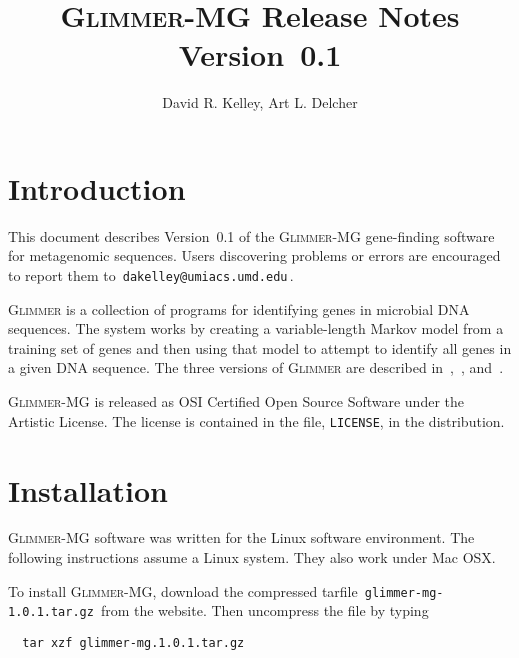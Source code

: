 \documentclass[fleqn,titlepage,11pt]{article}
\def\Glimmer{\textsc{Glimmer}}
\def\Gmg{\textsc{Glimmer-MG}}
\def\Pg#1{\texttt{#1}}
\begin{document}
\RaggedRight
\sloppy

\title{\Gmg{} Release Notes \\ Version~0.1}
\author{David R. Kelley, Art L. Delcher}

\maketitle

\section{Introduction}

This document describes Version~0.1 of the \Gmg{} gene-finding
software for metagenomic sequences.  Users discovering problems or
errors are encouraged to report them to
\,\verb`dakelley@umiacs.umd.edu`\,.

\Glimmer{} is a collection of programs for identifying genes in
microbial DNA sequences.  The system works by creating a
variable-length Markov model from a training set of genes and then
using that model to attempt to identify all genes in a given DNA
sequence.  The three versions of \Glimmer{} are described
in~\cite{glimmer1},~\cite{glimmer2}, and~\cite{glimmer3}.

\Gmg{} is released as OSI Certified Open Source Software under the
Artistic License.  The license is contained in the file, \Pg{LICENSE},
in the distribution.

\section{Installation}

\Gmg{} software was written for the Linux software environment.  The
following instructions assume a Linux system.  They also work under
Mac OSX.

To install \Gmg{}, download the compressed tarfile
\,\verb`glimmer-mg-1.0.1.tar.gz`\,
from the website.  Then uncompress the file by typing
\BSV
\begin{verbatim}
  tar xzf glimmer-mg.1.0.1.tar.gz
\end{verbatim}
\ESV
\end{document}

